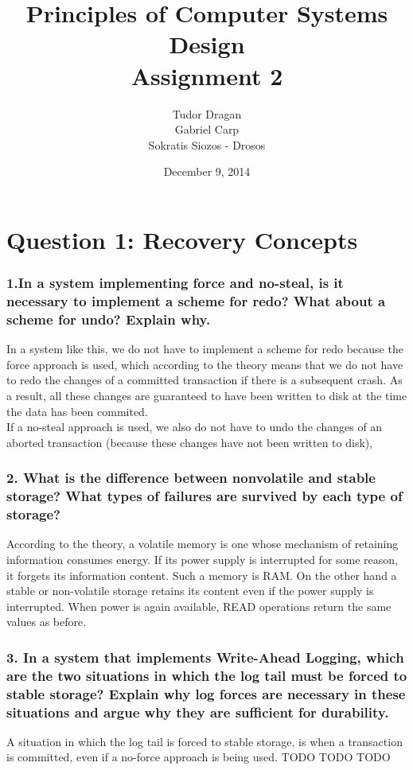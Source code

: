 \documentclass{article}      %
\title{\bf Principles of Computer Systems Design\\ {\Large Assignment 2}}  %
\author{Tudor Dragan\\
Gabriel Carp\\
Sokratis Siozos - Drosos}      %
\date{December 9, 2014}      %
\begin{document}

\maketitle                   %

\section*{Question 1: Recovery Concepts} 


\subsubsection*{1.In a system implementing force and no-steal, is it necessary to implement a scheme for redo? What about a scheme for undo? Explain why.}

In a system like this, we do not have to implement a scheme for redo because the force approach is used, which according to the theory means that we do not have to redo the changes of a committed transaction if there is a subsequent crash. As a result, all these changes are guaranteed to have been written to disk at the time the data has been commited. \\

If a no-steal approach is used, we also do not have to undo the changes of an aborted transaction (because these changes have not been written to disk),\\


\subsubsection*{2.  What is the difference between nonvolatile and stable storage? What types of failures are survived by each type of storage?}

According to the theory, a volatile memory is one whose mechanism of retaining information consumes energy. If its power supply is interrupted for some reason, it forgets its information content. Such a memory is RAM. On the other hand a stable or non-volatile storage retains its content even if the power supply is interrupted. When power is again available, READ operations return the same values as before.\\

\subsubsection*{3.  In a system that implements Write-Ahead Logging, which are the two situations in which the log tail must be forced to stable storage? Explain why log forces are necessary in these situations and argue why they are sufficient for durability.}
A situation in which the log tail is forced to stable storage, is when a transaction is committed, even if a no-force approach is being used.
TODO TODO TODO\\
\end{document}
